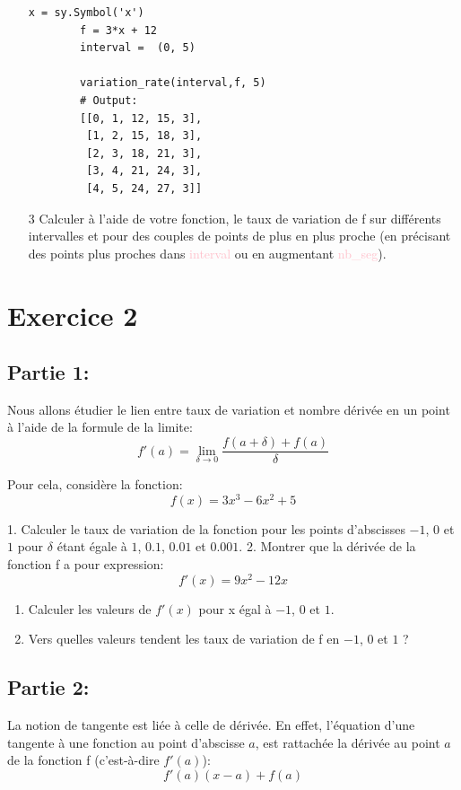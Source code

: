 \documentclass[11pt, french]{article}
\newcommand{\inlsnippet}[1]{\colorbox{gray!10}{\mbox{\textcolor{pink}{#1}}}}
\begin{document}
\begin{enumerate}
\begin{lstlisting}[style=nightly]
        x = sy.Symbol('x')
        f = 3*x + 12
        interval =  (0, 5)
        
        variation_rate(interval,f, 5)
        # Output:
        [[0, 1, 12, 15, 3],
         [1, 2, 15, 18, 3],
         [2, 3, 18, 21, 3],
         [3, 4, 21, 24, 3],
         [4, 5, 24, 27, 3]]
    \end{lstlisting}
    \item[3] Calculer à l'aide de votre fonction, le taux de variation de f sur différents intervalles et pour des couples de points de plus en plus proche (en précisant des points plus proches dans \inlsnippet{interval} ou en augmentant \inlsnippet{nb\_seg}).
\end{enumerate}
\vspace{1cm}

\section*{Exercice 2}
\subsection*{Partie 1:}
Nous allons étudier le lien entre taux de variation et nombre dérivée en un point à l'aide de la formule de la limite:
\begin{equation*}
    f'(a) = \lim_{\delta \rightarrow 0} \frac{f(a+\delta) + f(a)}{\delta}
\end{equation*}

Pour cela, considère la fonction:
\begin{equation*}
    f(x) = 3x^3 - 6x^2 + 5
\end{equation*}

1. Calculer le taux de variation de la fonction pour les points d'abscisses $-1$, $0$ et $1$ pour $\delta$ étant égale à $1$, $0.1$, $0.01$ et $0.001$.
2. Montrer que la dérivée de la fonction f a pour expression:
\begin{equation*}
f'(x) = 9x^2 - 12x
\end{equation*}
\begin{enumerate}
    \item Calculer les valeurs de $f'(x)$ pour x égal à $-1$, $0$ et $1$.
    \item Vers quelles valeurs tendent les taux de variation de f en $-1$, $0$ et $1$ ?
\end{enumerate}

\subsection*{Partie 2:}
La notion de tangente est liée à celle de dérivée.
En effet, l'équation d'une tangente à une fonction au point d'abscisse $a$, est rattachée la dérivée au point $a$ de la fonction f (c'est-à-dire $f'(a)$):
\begin{equation*}
    f'(a)(x-a) + f(a)
\end{equation*}
\end{document}
